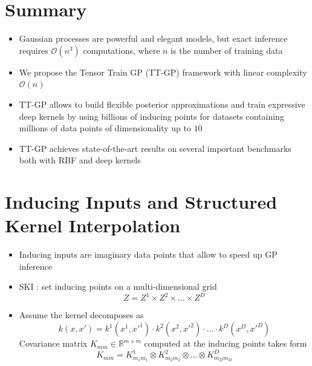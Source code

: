 \documentclass[a0,portrait]{a0poster}
\newcommand{\R}{\mathbb{R}}
\newcommand{\bigO}{\mathcal{O}}
\begin{document}
\begin{multicols}{2} %


%

\section*{\LARGE \color{NavyBlue}Summary}

\begin{itemize}
  \item Gaussian processes are powerful and elegant models, but exact inference 
    requires $\bigO(n^3)$ computations, where $n$ is the number of training data
  \item We propose the Tensor Train GP (TT-GP) framework with 
    linear complexity  $\bigO(n)$ 
  \item TT-GP allows to build flexible posterior approximations and train
    expressive deep kernels by using billions of inducing points for datasets
    containing millions of data points of dimensionality up to $10$
  \item TT-GP achieves state-of-the-art results on several important benchmarks
    both with RBF and deep kernels
\end{itemize}

\section*{\LARGE \color{NavyBlue}Inducing Inputs and Structured Kernel Interpolation}

\begin{itemize}
  \item Inducing inputs are imaginary data points that allow to speed up GP inference
  \item SKI \citep{wilson2015}: set inducing points on a multi-dimensional grid
    \[
      Z = Z^1 \times Z^2 \times \ldots \times Z^D
    \]
  
  \item Assume the kernel decomposes as
    \[
      k(x, x') = k^1(x^1, x'^1) \cdot k^2(x^2, x'^2) \cdot \ldots \cdot k^D(x^D, x'^D)
    \]
    Covariance matrix $K_{mm} \in \R^{m \times m}$ computed at the
    inducing points takes form
    \[
      K_{mm} = K_{m_1 m_1}^1 \otimes K_{m_2 m_2}^2 \otimes \ldots \otimes K_{m_D m_D}^D
    \] 


\end{itemize}
\end{multicols}
\end{document}
